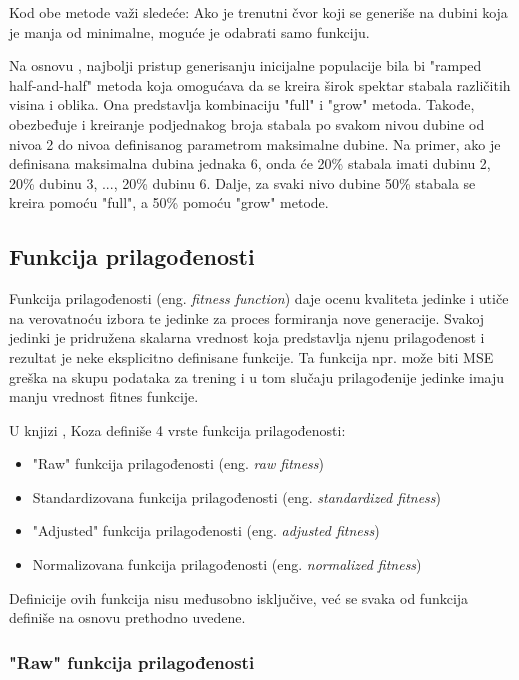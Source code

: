 \documentclass[main.tex]{subfiles}
\begin{document}
Kod obe metode važi sledeće: Ako je trenutni čvor koji se generiše na dubini koja je manja od minimalne, moguće je odabrati samo funkciju.

Na osnovu \cite{koza}, najbolji pristup generisanju inicijalne populacije bila bi "ramped half-and-half" metoda koja omogućava da se kreira širok spektar stabala različitih visina i oblika. Ona predstavlja kombinaciju "full" i "grow" metoda. Takođe, obezbeđuje i kreiranje podjednakog broja stabala po svakom nivou dubine od nivoa 2 do nivoa definisanog parametrom maksimalne dubine. Na primer, ako je definisana maksimalna dubina jednaka 6, onda će 20\% stabala imati dubinu 2, 20\% dubinu 3, ..., 20\% dubinu 6. Dalje, za svaki nivo dubine 50\% stabala se kreira pomoću "full", a 50\% pomoću "grow" metode.


\subsection{Funkcija prilagođenosti}
\label{sec:fitness}

Funkcija prilagođenosti (eng. \textit{fitness function}) daje ocenu kvaliteta jedinke i utiče na verovatnoću izbora te jedinke za proces formiranja nove generacije. Svakoj jedinki je pridružena skalarna vrednost koja predstavlja njenu prilagođenost i rezultat je neke eksplicitno definisane funkcije. Ta funkcija npr. može biti MSE greška na skupu podataka za trening i u tom slučaju prilagođenije jedinke imaju manju vrednost fitnes funkcije.

U knjizi \cite{koza}, Koza definiše 4 vrste funkcija prilagođenosti:
\begin{itemize}
    \item "Raw" funkcija prilagođenosti (eng. \textit{raw fitness}) %
    \item Standardizovana funkcija prilagođenosti (eng. \textit{standardized fitness})
    \item "Adjusted" funkcija prilagođenosti (eng. \textit{adjusted fitness})
    \item Normalizovana funkcija prilagođenosti (eng. \textit{normalized fitness})
\end{itemize}

Definicije ovih funkcija nisu međusobno isključive, već se svaka od funkcija definiše na osnovu prethodno uvedene.

\subsubsection{"Raw" funkcija prilagođenosti}
\label{sec:rawFitness}
\end{document}
